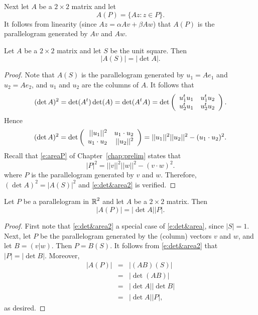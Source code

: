 \documentclass{ximera}
\begin{document}
Next let $A$ be a $2\times 2$ matrix and let
\[
A(P) = \{Az:z\in P\}.
\]
It follows from linearity (since $Az=\alpha Av+\beta Aw$) that $A(P)$ is the
parallelogram generated by $Av$ and $Aw$.

\begin{proposition}  \label{P:det&area}
Let $A$ be a $2\times 2$ matrix and let $S$ be the unit square.  Then 
\begin{equation}  \label{e:det&area2}
|A(S)| = |\det A|.
\end{equation}
\end{proposition}

\begin{proof}   Note that $A(S)$ is the parallelogram generated by $u_1=Ae_1$ and 
$u_2=Ae_2$, and $u_1$ and $u_2$ are the columns of $A$.  It follows that
\[
(\det A)^2=\det(A^t)\det(A)=\det(A^tA) =
\det\left(\begin{array}{rr} u_1^tu_1 & u_1^tu_2\\ u_2^tu_1 &u_2^tu_2\end{array}\right).
\]
Hence
\[
(\det A)^2=
\det\left(\begin{array}{rr} ||u_1||^2 & u_1\cdot u_2\\ u_1\cdot u_2 &||u_2||^2\end{array}\right) =
||u_1||^2||u_2||^2-(u_1\cdot u_2)^2.
\]
Recall that \eqref{e:areaP} of Chapter~\ref{chap:prelim} states that
\[
|P|^2 = ||v||^2||w||^2 - (v\cdot w)^2.
\]
where $P$ is the parallelogram generated by $v$ and $w$.  Therefore, 
$(\det A)^2 = |A(S)|^2$ and \eqref{e:det&area2} is verified. \end{proof}


\begin{theorem}  \label{T:det&area}
Let $P$ be a parallelogram in $\mbox{$\Bbb{R}$}^2$ and let $A$ be a $2\times 2$
matrix.  Then
\begin{equation} \label{e:det&area}
|A(P)| = |\det A||P|.
\end{equation}
\end{theorem}

\begin{proof}  First note that \eqref{e:det&area2} a special case of \eqref{e:det&area}, 
since $|S|=1$.   Next, let $P$ be the parallelogram generated by the (column)
vectors $v$ and $w$, and let $B=(v|w)$.  Then $P=B(S)$.  It
follows from \eqref{e:det&area2} that $|P|=|\det B|$.  Moreover,
\begin{eqnarray*}
|A(P)| & = & |(AB)(S)| \\
& = & |\det(AB)| \\
& = & |\det A||\det B| \\
& = & |\det A||P|,
\end{eqnarray*}
as desired.  \end{proof}

\EXER
\end{document}
